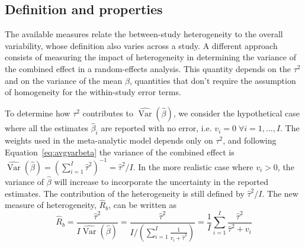 \documentclass[11pt,a4paper,twoside,openany]{book}\usepackage{knitr}
\DeclareMathOperator{\Var}{Var}
\begin{document}
{{\subsection{Definition and properties}

The available measures relate the between-study heterogeneity to the overall variability, whose definition also varies across a study. A different approach consists of measuring the impact of heterogeneity in determining the variance of the combined effect in a random-effects analysis. This quantity depends on the $\tau^2$ and on the variance of the mean $\hat \beta$, quantities that don't require the assumption of homogeneity for the within-study error terms.

To determine how $\tau^2$ contributes to $\widehat{\Var} \left(\hat \beta \right)$, we consider the hypothetical case where all the estimates $\hat \beta_i$ are reported with no error, i.e. $v_i = 0 \; \forall i = 1, \dots, I$. The weights used in the meta-analytic model depends only on $\tau^2$, and following Equation~\ref{eq:avgvarbeta} the variance of the combined effect is $\widehat{\Var} \left(\hat \beta \right) = \left(\sum_{i = 1}^I \hat \tau^2 \right)^{-1} = \hat \tau^2/I$.
In the more realistic case where $v_i > 0$, the variance of $\hat \beta$ will increase to incorporate the uncertainty in the reported estimates. The contribution of the heterogeneity is still defined by $\hat \tau^2/I$. The new measure of heterogeneity, $\hat R_b$, can be written as
\begin{equation}
\hat R_b = \frac{\hat \tau^2}{I \widehat{\Var} \left(\hat \beta \right)} = \frac{\hat \tau^2}{I/\left( \sum_{i = 1}^I \frac{1}{v_i + \hat \tau^2} \right)} = \frac{1}{I}\sum_{i = 1}^I \frac{\hat \tau^2}{\hat \tau^2 + v_i}
\label{eq:Rb}
\end{equation}

}}
\end{document}
